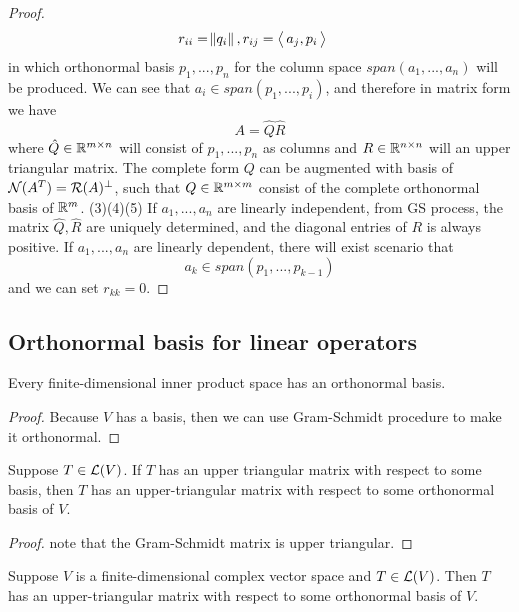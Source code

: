 \begin{refsection}
\begin{proof}
\begin{align*}
	r_{ii} &= \norm{q_i}, r_{ij} = {\left< \, a_j,p_i \, \right>}
	\end{align*}
	in which orthonormal basis $p_1,...,p_n$ for the column space $span(a_1,...,a_n)$ will be produced. 
	We can see that $a_i \in span(p_1,...,p_i)$, and therefore in matrix form we have
	$$A = \hat{Q}\hat{R}$$
	where $\hat{Q} \in \mathbb{R}^{m\times n}$ will consist of $p_1,...,p_n$ as columns and $R\in \mathbb{R}^{n\times n}$ will an upper triangular matrix. 
	The complete form $Q$ can be augmented with basis of $\mathcal{N}(A^T) = \mathcal{R}(A)^\perp$, such that $Q\in \mathbb{R}^{m\times m}$ consist of the complete orthonormal basis of $\mathbb{R}^m$.
	(3)(4)(5) If $a_1,...,a_n$ are linearly independent, from GS process, the matrix $\hat{Q},\hat{R}$ are uniquely determined, and the diagonal entries of $R$ is always positive. If $a_1,...,a_n$ are linearly dependent, there will exist scenario that 
	$$a_k \in span(p_1,...,p_{k-1})$$ and we can set $r_{kk} = 0$. 
\end{proof}


\subsection{Orthonormal basis for linear operators}

\begin{lemma}
\cite[185]{axler2015linear}Every finite-dimensional inner product space has an orthonormal basis.
\end{lemma}
\begin{proof}
Because $V$ has a basis, then we can use Gram-Schmidt procedure to make it orthonormal.
\end{proof}



\begin{lemma}
\cite[186]{axler2015linear} Suppose $T\in \mathcal{L}(V)$. If $T$ has an upper triangular matrix with respect to some basis, then $T$ has an upper-triangular matrix with respect to some orthonormal basis of $V$.
\end{lemma}

\begin{proof}
note that the Gram-Schmidt matrix is upper triangular.
\end{proof}
 

\begin{theorem}
Suppose $V$ is a finite-dimensional complex vector space and $T\in \mathcal{L}(V)$. Then $T$ has an upper-triangular matrix with respect to some orthonormal basis of $V$.
\end{theorem}


\end{refsection}
